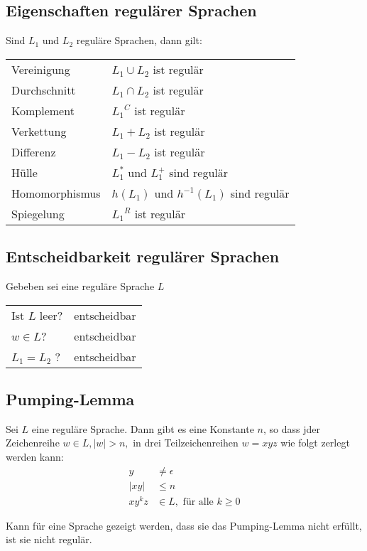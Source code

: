 \subsection{Eigenschaften regulärer Sprachen}
Sind $L_1$ und $L_2$ reguläre Sprachen, dann gilt:
\settowidth{\MyLenA}{ Homomorphismus~~}
\begin{tabular}{@{}p{\the\MyLenA}%
				@{}p{\linewidth-\the\MyLenA}}
	Vereinigung & $L_1 \cup L_2$ ist regulär\\
	Durchschnitt & $L_1 \cap L_2$ ist regulär\\
	Komplement & ${L_1}^C$ ist regulär\\
	Verkettung & $L_1 + L_2$ ist regulär\\
	Differenz & $L_1 - L_2$ ist regulär\\
	Hülle & $L_1^*$ und $ L_1^+$ sind regulär\\
	Homomorphismus & $h(L_1)$ und $h^{-1}(L_1)$ sind regulär\\
	Spiegelung & ${L_1}^R$ ist regulär\\
\end{tabular}

\subsection{Entscheidbarkeit regulärer Sprachen}
Gebeben sei eine reguläre Sprache $L$
\settowidth{\MyLenA}{Ist $L$ inhärent mehrdeutig?~~}
\begin{tabular}{@{}p{\the\MyLenA}%
				@{}p{\linewidth-\the\MyLenA}}
	Ist $L$ leer? & entscheidbar\\
	$w \in L$? & entscheidbar\\
	$L_1 = L_2$ ? & entscheidbar\\
\end{tabular}

\subsection{Pumping-Lemma}
Sei $L$ eine reguläre Sprache. Dann gibt es eine Konstante $n$, so dass jder Zeichenreihe $w \in L, |w| > n,$ in drei Teilzeichenreihen $w = xyz$ wie folgt
zerlegt werden kann:
\begin{align*}
	y & \neq \epsilon\\
	|xy| & \leq n\\
	xy^kz &\in L, \mbox{ für alle }k \geq 0 
\end{align*}
\begin{center}
\end{center}
Kann für eine Sprache gezeigt werden, dass sie das Pumping-Lemma nicht erfüllt,
ist sie nicht regulär.

